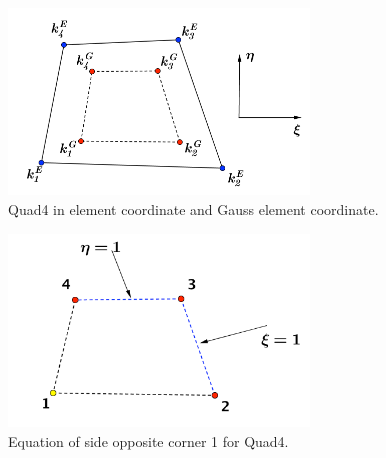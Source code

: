 \begin{figure}[h]
	\begin{center}
		\includegraphics[width=8cm,clip]{Quad4_1.pdf}			
		\caption{Quad4 in element coordinate and Gauss element coordinate.}	\label{fig: Quad4_1}
	\end{center} 
\end{figure}

\begin{figure}[h]
	\begin{center}
		\includegraphics[width=8cm,clip]{Quad4_2.pdf}			
		\caption{Equation of side opposite corner 1 for Quad4.} \label{fig: Quad4_2}
	\end{center} 
\end{figure}

